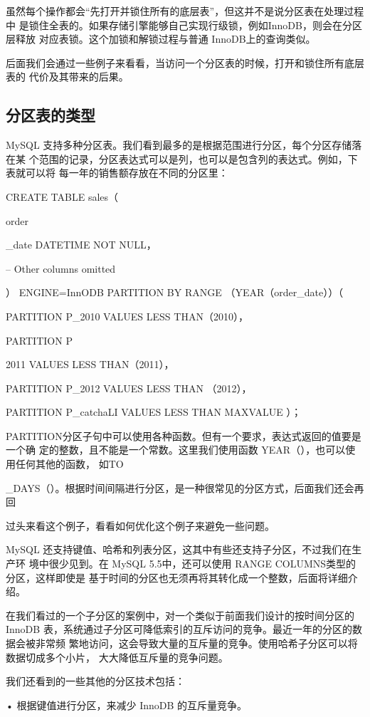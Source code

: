 虽然每个操作都会“先打开并锁住所有的底层表”，但这并不是说分区表在处理过程中
是锁住全表的。如果存储引擎能够自己实现行级锁，例如InnoDB，则会在分区层释放
对应表锁。这个加锁和解锁过程与普通 InnoDB上的查询类似。

后面我们会通过一些例子来看看，当访问一个分区表的时候，打开和锁住所有底层表的
代价及其带来的后果。

\subsection{分区表的类型}
MySQL 支持多种分区表。我们看到最多的是根据范围进行分区，每个分区存储落在某
个范围的记录，分区表达式可以是列，也可以是包含列的表达式。例如，下表就可以将
每一年的销售额存放在不同的分区里：

CREATE TABLE sales（

order

\_date DATETIME NOT NULL，

-- Other columns omitted

） ENGINE=InnODB PARTITION BY RANGE （YEAR（order\_date））（

PARTITION P\_2010 VALUES LESS THAN（2010），

PARTITION P

2011 VALUES LESS THAN（2011），

PARTITION P\_2012 VALUES LESS THAN （2012），

PARTITION P\_catchaLI VALUES LESS THAN MAXVALUE ）；

PARTITION分区子句中可以使用各种函数。但有一个要求，表达式返回的值要是一个确
定的整数，且不能是一个常数。这里我们使用函数 YEAR（），也可以使用任何其他的函数，
如TO

\_DAYS（）。根据时间间隔进行分区，是一种很常见的分区方式，后面我们还会再回

过头来看这个例子，看看如何优化这个例子来避免一些问题。

MySQL 还支持键值、哈希和列表分区，这其中有些还支持子分区，不过我们在生产环
境中很少见到。在 MySQL 5.5中，还可以使用 RANGE COLUMNS类型的分区，这样即使是
基于时间的分区也无须再将其转化成一个整数，后面将详细介绍。

在我们看过的一个子分区的案例中，对一个类似于前面我们设计的按时间分区的InnoDB
表，系统通过子分区可降低索引的互斥访问的竞争。最近一年的分区的数据会被非常频
繁地访问，这会导致大量的互斥量的竞争。使用哈希子分区可以将数据切成多个小片，
大大降低互斥量的竞争问题。

我们还看到的一些其他的分区技术包括：

• 根据键值进行分区，来减少 InnoDB 的互斥量竞争。

